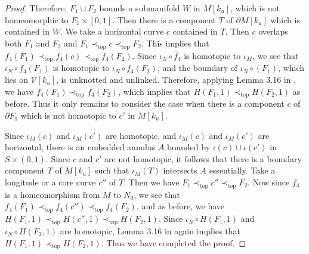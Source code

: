 \documentclass{amsart}
\theoremstyle{definition}
\numberwithin{figure}{section}
\numberwithin{equation}{section}
\newcommand{\blackboard}[1]{\ensuremath{\mathbb{#1}}}
\newcommand{\reals}{\blackboard{R}}
\newcommand{\pretop}{\prec_\mathrm{top}}
\def\cv{\mathcal{V}}
\begin{document}
\begin{proof}
Therefore, $F_1 \cup F_2$ bounds a submanifold $W$ in $M[k_u]$, which  is not homeomorphic to $F_1 \times [0,1]$.
Then there is  a component $T$ of $\partial M[k_u]$ which is contained in $W$.
We take a horizontal curve $c$ contained in $T$.
Then $c$ overlaps both $F_1$ and $F_2$ and $F_1 \pretop c \pretop F_2$.
This implies that $f_4(F_1) \pretop f_4(c) \pretop  f_4(F_2)$.
Since $\iota_N \circ \hat f_4$ is homotopic to $\iota_M$, we see that $\iota_N \circ f_4(F_1)$ is homotopic to $\iota_N \circ f_4(F_2)$, and the boundary of $\iota_N \circ (F_1)$, which lies on $\cv[k_u]$,  is unknotted and unlinked.
Therefore, applying  Lemma 3.16 in \cite{bcm}, we have $f_4(F_1) \pretop f_4(F_2)$, which implies that $H(F_1, 1) \pretop H(F_2,1)$ as before.
Thus it only remains to consider the case when there is a component $c$ of $\partial F_1$ which is not homotopic to $c'$ in $M[k_u]$.

Since $\iota_M(c)$ and $\iota_M(c')$ are homotopic, and $\iota_M(c)$ and $\iota_M(c')$ are horizontal, there is an embedded annulus $A$ bounded by $\iota(c) \cup \iota(c')$ in $S \times (0,1)$.
Since $c$ and $c'$ are not homotopic, it follows that there is a boundary component $T$ of $M[k_u]$ such that $\iota_M(T)$ intersects $A$ essentially.
Take a longitude or a core curve $c''$ of $T$. 
Then we have  $F_1 \pretop c'' \pretop  F_2$.
Now since $f_4$ is a homeomorphism from $M$ to $N_0$, we see that $f_4(F_1) \pretop f_4(c'') \pretop f_4(F_2)$, and as before, we have $H(F_1, 1) \pretop H(c'', 1) \pretop H(F_2,1)$.
Since $\iota_N \circ H(F_1,1)$ and $\iota_N \circ H(F_2,1)$ are homotopic, Lemma 3.16 in \cite{bcm} again implies that $H(F_1,1) \pretop H(F_2,1)$.
Thus we have completed the proof.
%
\end{proof}
\end{document}
